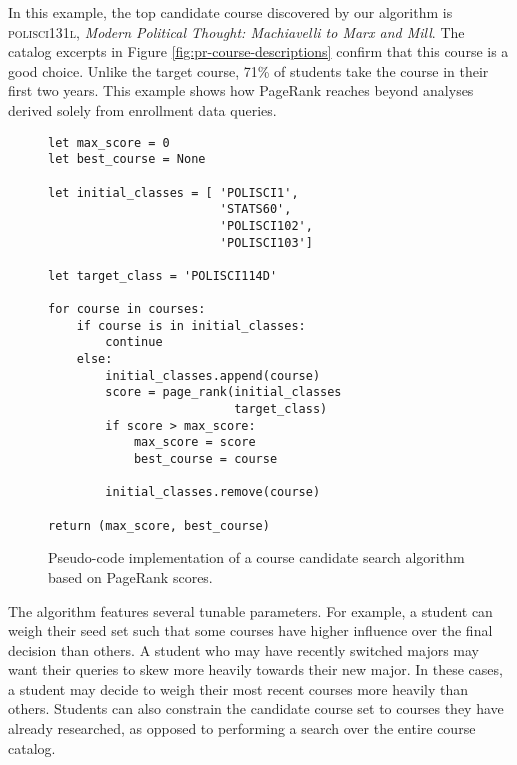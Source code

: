 In this example, the top candidate course discovered by our algorithm
is \textsc{polisci131l}, {\em Modern Political Thought: Machiavelli to Marx
  and Mill}. The catalog excerpts in Figure
\ref{fig:pr-course-descriptions} confirm that this course is a good
choice. Unlike the target course, 71\% of students take the course in
their first two years. This example shows how PageRank reaches beyond
analyses derived solely from enrollment data queries.


\lstset{language=Python}          %

\begin{figure}
    \begin{lstlisting}[frame=single] 
let max_score = 0
let best_course = None 

let initial_classes = [ 'POLISCI1',
                        'STATS60',
                        'POLISCI102',
                        'POLISCI103']
                        
let target_class = 'POLISCI114D'

for course in courses:
    if course is in initial_classes:
        continue
    else:
        initial_classes.append(course)
        score = page_rank(initial_classes
                          target_class)
        if score > max_score:
            max_score = score
            best_course = course
        
        initial_classes.remove(course)

return (max_score, best_course)
\end{lstlisting}
\caption{Pseudo-code implementation of a course candidate search algorithm based on PageRank scores.}
\label{fig:course-recommendation-algorithm}
\end{figure}

The algorithm features several tunable parameters. For example, a
student can weigh their seed set such that some courses have higher
influence over the final decision than others. A student who may have
recently switched majors may want their queries to skew more heavily
towards their new major. In these cases, a student may decide to weigh
their most recent courses more heavily than others. Students can also
constrain the candidate course set to courses they have already
researched, as opposed to performing a search over the entire course
catalog.

